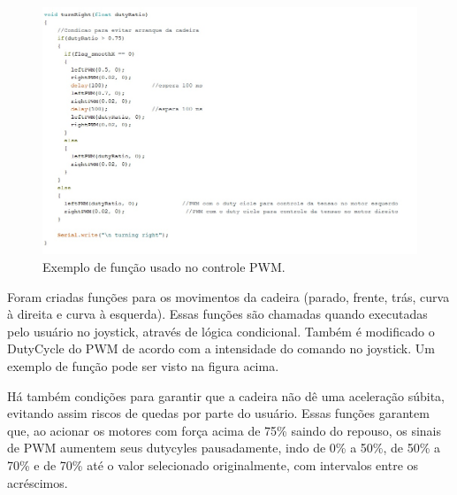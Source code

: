 \begin{figure}[h!]
  \centering
  \includegraphics[width=1.0\textwidth]{figuras/Funcoes.jpg}
  \caption{Exemplo de função usado no controle PWM.}
    \label{fig:funcoes}
\end{figure}

Foram criadas funções para os movimentos da cadeira (parado, frente, trás, curva à direita e curva à esquerda). Essas funções são chamadas quando executadas pelo usuário no joystick, através de lógica condicional. Também é modificado o DutyCycle do PWM de acordo com a intensidade do comando no joystick. Um exemplo de função pode ser visto na figura acima.

Há também condições para garantir que a cadeira não dê uma aceleração súbita, evitando assim riscos de quedas por parte do usuário. Essas funções garantem que, ao acionar os motores com força acima de 75\% saindo do repouso, os sinais de PWM aumentem seus dutycyles pausadamente, indo de 0\% a 50\%, de 50\% a 70\% e de 70\% até o valor selecionado originalmente, com intervalos entre os acréscimos.


